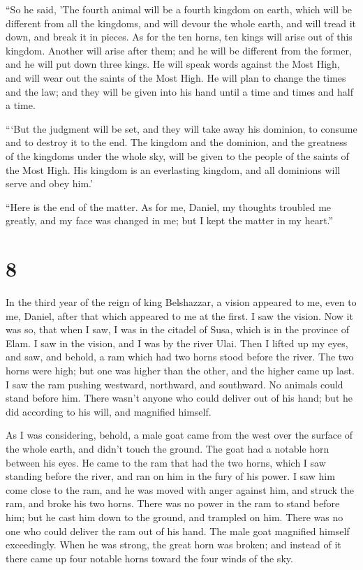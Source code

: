  ``So he said, 'The fourth animal will be a fourth
kingdom on earth, which will be different from all the kingdoms, and
will devour the whole earth, and will tread it down, and break it in
pieces.  As for the ten horns, ten kings will arise out
of this kingdom. Another will arise after them; and he will be different
from the former, and he will put down three kings.  He
will speak words against the Most High, and will wear out the saints of
the Most High. He will plan to change the times and the law; and they
will be given into his hand until a time and times and half a time.

 ```But the judgment will be set, and they will take away
his dominion, to consume and to destroy it to the end. 
The kingdom and the dominion, and the greatness of the kingdoms under
the whole sky, will be given to the people of the saints of the Most
High. His kingdom is an everlasting kingdom, and all dominions will
serve and obey him.'

 ``Here is the end of the matter. As for me, Daniel, my
thoughts troubled me greatly, and my face was changed in me; but I kept
the matter in my heart.''

\hypertarget{section-7}{%
\section{8}\label{section-7}}

 In the third year of the reign of king Belshazzar, a
vision appeared to me, even to me, Daniel, after that which appeared to
me at the first.  I saw the vision. Now it was so, that
when I saw, I was in the citadel of Susa, which is in the province of
Elam. I saw in the vision, and I was by the river Ulai. 
Then I lifted up my eyes, and saw, and behold, a ram which had two horns
stood before the river. The two horns were high; but one was higher than
the other, and the higher came up last.  I saw the ram
pushing westward, northward, and southward. No animals could stand
before him. There wasn't anyone who could deliver out of his hand; but
he did according to his will, and magnified himself.

 As I was considering, behold, a male goat came from the
west over the surface of the whole earth, and didn't touch the ground.
The goat had a notable horn between his eyes.  He came to
the ram that had the two horns, which I saw standing before the river,
and ran on him in the fury of his power.  I saw him come
close to the ram, and he was moved with anger against him, and struck
the ram, and broke his two horns. There was no power in the ram to stand
before him; but he cast him down to the ground, and trampled on him.
There was no one who could deliver the ram out of his hand.
 The male goat magnified himself exceedingly. When he was
strong, the great horn was broken; and instead of it there came up four
notable horns toward the four winds of the sky.

